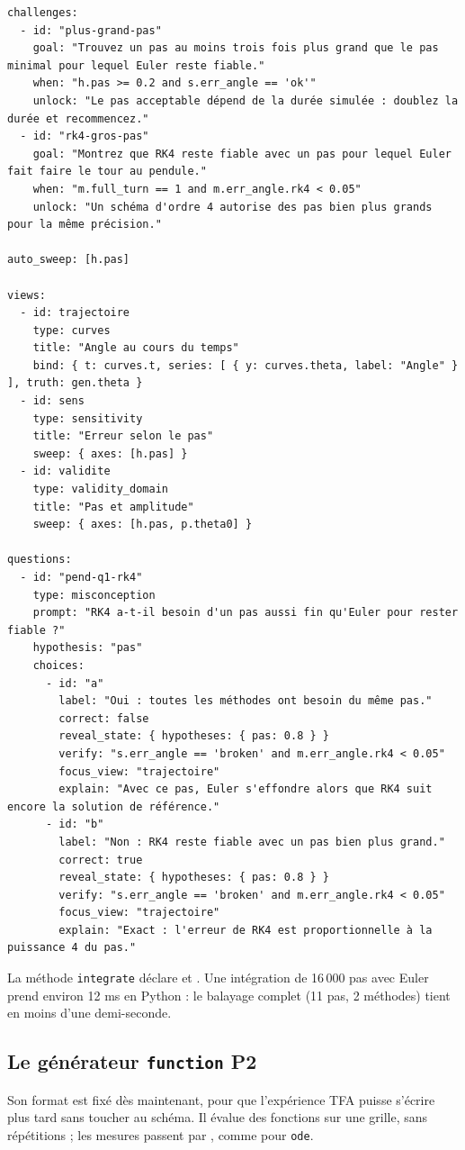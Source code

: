 \documentclass[11pt,a4paper]{article}
\newcommand{\ptwo}{\colorbox{ctBaseline!18}{\footnotesize\textbf{P2}}}
\begin{document}
\begin{appendices}
\begin{lstlisting}[caption={Fichier de référence \texttt{experiments/pendule\_euler.yaml}.}]
challenges:
  - id: "plus-grand-pas"
    goal: "Trouvez un pas au moins trois fois plus grand que le pas minimal pour lequel Euler reste fiable."
    when: "h.pas >= 0.2 and s.err_angle == 'ok'"
    unlock: "Le pas acceptable dépend de la durée simulée : doublez la durée et recommencez."
  - id: "rk4-gros-pas"
    goal: "Montrez que RK4 reste fiable avec un pas pour lequel Euler fait faire le tour au pendule."
    when: "m.full_turn == 1 and m.err_angle.rk4 < 0.05"
    unlock: "Un schéma d'ordre 4 autorise des pas bien plus grands pour la même précision."

auto_sweep: [h.pas]

views:
  - id: trajectoire
    type: curves
    title: "Angle au cours du temps"
    bind: { t: curves.t, series: [ { y: curves.theta, label: "Angle" } ], truth: gen.theta }
  - id: sens
    type: sensitivity
    title: "Erreur selon le pas"
    sweep: { axes: [h.pas] }
  - id: validite
    type: validity_domain
    title: "Pas et amplitude"
    sweep: { axes: [h.pas, p.theta0] }

questions:
  - id: "pend-q1-rk4"
    type: misconception
    prompt: "RK4 a-t-il besoin d'un pas aussi fin qu'Euler pour rester fiable ?"
    hypothesis: "pas"
    choices:
      - id: "a"
        label: "Oui : toutes les méthodes ont besoin du même pas."
        correct: false
        reveal_state: { hypotheses: { pas: 0.8 } }
        verify: "s.err_angle == 'broken' and m.err_angle.rk4 < 0.05"
        focus_view: "trajectoire"
        explain: "Avec ce pas, Euler s'effondre alors que RK4 suit encore la solution de référence."
      - id: "b"
        label: "Non : RK4 reste fiable avec un pas bien plus grand."
        correct: true
        reveal_state: { hypotheses: { pas: 0.8 } }
        verify: "s.err_angle == 'broken' and m.err_angle.rk4 < 0.05"
        focus_view: "trajectoire"
        explain: "Exact : l'erreur de RK4 est proportionnelle à la puissance 4 du pas."
\end{lstlisting}

La méthode \texttt{integrate} déclare  et . Une intégration de 16\,000 pas avec Euler prend environ 12 ms en Python : le balayage complet (11 pas, 2 méthodes) tient en moins d'une demi-seconde.

\subsection{Le générateur \texttt{function} \ptwo{}}\label{ann:yaml-function}
Son format est fixé dès maintenant, pour que l'expérience TFA puisse s'écrire plus tard sans toucher au schéma. Il évalue des fonctions sur une grille, sans répétitions ; les mesures passent par , comme pour \texttt{ode}.


\end{appendices}
\end{document}
